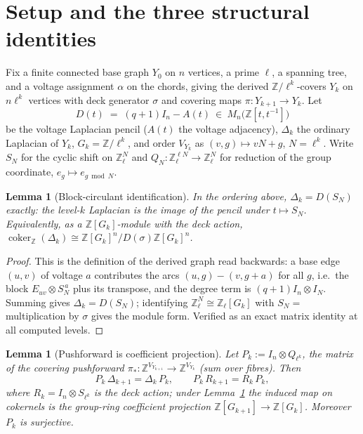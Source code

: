 \documentclass[11pt]{amsart}
\numberwithin{equation}{section}
\newtheorem{lemma}[theorem]{Lemma}
\theoremstyle{definition}
\theoremstyle{remark}
\newcommand{\Z}{\mathbb{Z}}
\newcommand{\Zl}{\Z_\ell}
\newcommand{\coker}{\operatorname{coker}}
\begin{document}
\section{Setup and the three structural identities}\label{sec:setup}

Fix a finite connected base graph $Y_0$ on $n$ vertices, a prime $\ell$, a spanning
tree, and a voltage assignment $\alpha$ on the chords, giving the derived
$\Z/\ell^k$-covers $Y_k$ on $n\ell^k$ vertices with deck generator $\sigma$ and
covering maps $\pi\colon Y_{k+1}\to Y_k$. Let
\[
D(t)\;=\;(q+1)I_n-A(t)\ \in\ M_n\bigl(\Z[t,t^{-1}]\bigr)
\]
be the voltage Laplacian pencil ($A(t)$ the voltage adjacency), $\Delta_k$ the
ordinary Laplacian of $Y_k$, $G_k=\Z/\ell^k$, and order $V_{Y_k}$ as
$(v,g)\mapsto vN+g$, $N=\ell^k$. Write $S_N$ for the cyclic shift on $\Zl^N$ and
$Q_N\colon\Zl^{\ell N}\to\Zl^{N}$ for reduction of the group coordinate,
$e_g\mapsto e_{g\bmod N}$.

\begin{lemma}[Block-circulant identification]\label{lem:block}
In the ordering above, $\Delta_k=D(S_N)$ exactly: the level-$k$ Laplacian is the
image of the pencil under $t\mapsto S_N$. Equivalently, as a
$\Z[G_k]$-module with the deck action,
$\coker_\Z(\Delta_k)\cong\Z[G_k]^n\big/D(\sigma)\Z[G_k]^n$.
\end{lemma}

\begin{proof}
This is the definition of the derived graph read backwards: a base edge $(u,v)$ of
voltage $a$ contributes the arcs $(u,g)\!-\!(v,g{+}a)$ for all $g$, i.e.\ the block
$E_{uv}\otimes S_N^{\,a}$ plus its transpose, and the degree term is
$(q+1)I_n\otimes I_N$. Summing gives $\Delta_k=D(S_N)$; identifying
$\Zl^N\cong\Zl[G_k]$ with $S_N=$ multiplication by $\sigma$ gives the module form.
Verified as an exact matrix identity at all computed levels.
\end{proof}

\begin{lemma}[Pushforward is coefficient projection]\label{lem:norm}
Let $P_k:=I_n\otimes Q_{\ell^k}$, the matrix of the covering pushforward
$\pi_*\colon\Z^{V_{Y_{k+1}}}\to\Z^{V_{Y_k}}$ (sum over fibres). Then
\[
P_k\,\Delta_{k+1}=\Delta_k\,P_k,
\qquad
P_k\,R_{k+1}=R_k\,P_k,
\]
where $R_k=I_n\otimes S_{\ell^k}$ is the deck action; under
Lemma~\ref{lem:block} the induced map on cokernels is the group-ring coefficient
projection $\Z[G_{k+1}]\to\Z[G_k]$. Moreover $P_k$ is surjective.
\end{lemma}
\end{document}
